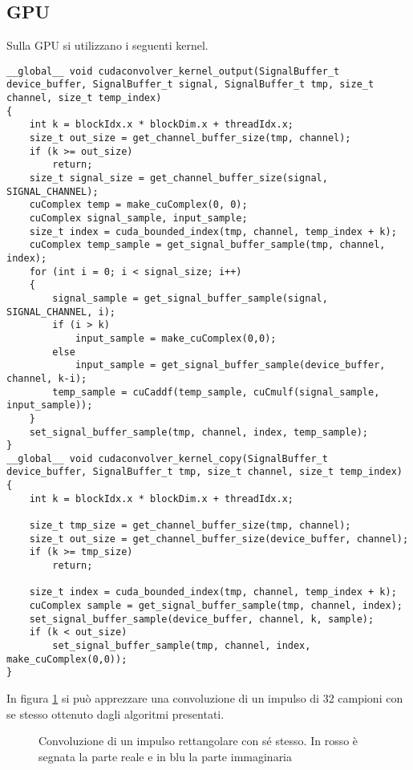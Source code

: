 \subsection{GPU}
Sulla GPU si utilizzano i seguenti kernel.
\begin{lstlisting}
__global__ void cudaconvolver_kernel_output(SignalBuffer_t device_buffer, SignalBuffer_t signal, SignalBuffer_t tmp, size_t channel, size_t temp_index)
{
	int k = blockIdx.x * blockDim.x + threadIdx.x;
	size_t out_size = get_channel_buffer_size(tmp, channel);
	if (k >= out_size)
		return;
	size_t signal_size = get_channel_buffer_size(signal, SIGNAL_CHANNEL);
	cuComplex temp = make_cuComplex(0, 0);
	cuComplex signal_sample, input_sample;
	size_t index = cuda_bounded_index(tmp, channel, temp_index + k);
	cuComplex temp_sample = get_signal_buffer_sample(tmp, channel, index);
	for (int i = 0; i < signal_size; i++)
	{
		signal_sample = get_signal_buffer_sample(signal, SIGNAL_CHANNEL, i);
		if (i > k)
			input_sample = make_cuComplex(0,0);
		else
			input_sample = get_signal_buffer_sample(device_buffer, channel, k-i);
		temp_sample = cuCaddf(temp_sample, cuCmulf(signal_sample, input_sample));
	}
	set_signal_buffer_sample(tmp, channel, index, temp_sample);
}
__global__ void cudaconvolver_kernel_copy(SignalBuffer_t device_buffer, SignalBuffer_t tmp, size_t channel, size_t temp_index)
{
	int k = blockIdx.x * blockDim.x + threadIdx.x;

	size_t tmp_size = get_channel_buffer_size(tmp, channel);
	size_t out_size = get_channel_buffer_size(device_buffer, channel);
	if (k >= tmp_size)
		return;

	size_t index = cuda_bounded_index(tmp, channel, temp_index + k);
	cuComplex sample = get_signal_buffer_sample(tmp, channel, index);
	set_signal_buffer_sample(device_buffer, channel, k, sample);
	if (k < out_size)
		set_signal_buffer_sample(tmp, channel, index, make_cuComplex(0,0));
}
\end{lstlisting}

In figura \ref{fig:pulse32conv} si può apprezzare una convoluzione di un impulso di 32 campioni con se stesso ottenuto dagli algoritmi presentati.

\begin{figure}[h]
    \centering
    \caption{Convoluzione di un impulso rettangolare con sé stesso. In rosso è segnata la parte reale e in blu la parte immaginaria}
    \label{fig:pulse32conv}
\end{figure}